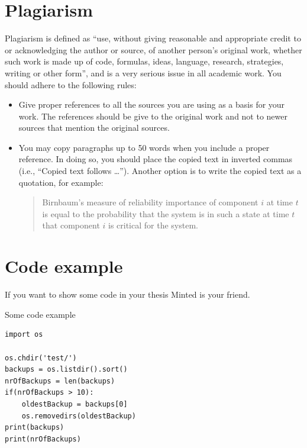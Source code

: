 \documentclass[../Main/thesis.tex]{subfiles}
\begin{document}
\section{Plagiarism}
\label{sec:plagiarism}
Plagiarism is defined as ``use, without giving reasonable and appropriate credit to or acknowledging the author or source, of another person's original work, whether such work is made up of code, formulas, ideas, language, research, strategies, writing or other form'', and is a very serious issue in all academic work. You should adhere to the following rules:
\begin{itemize}
\item Give proper references to all the sources you are using as a basis for your work. The references should be give to the original work and not to newer sources that mention the original sources.
\item You may copy paragraphs up to 50 words when you include a proper reference. In doing so, you should place the copied text in inverted commas (i.e., ``Copied text follows \ldots''). Another option is to write the copied text as a quotation, for example:
\begin{quote}
Birnbaum's measure of reliability importance of component $i$ at time $t$ is equal to the probability that the system is in such a state at time $t$ that component $i$ is critical for the system.\newline \mbox{} \hfill \citet{rausand04}
\end{quote}
\end{itemize}

\section{Code example}
\label{sec:code_example}
If you want to show some code in your thesis Minted is your friend.
\begin{listing}[ht]
\caption{Some code example}
\label{lst:clean.py}
\begin{verbatim}
import os

os.chdir('test/')
backups = os.listdir().sort()
nrOfBackups = len(backups)
if(nrOfBackups > 10):
    oldestBackup = backups[0]
    os.removedirs(oldestBackup)
print(backups)
print(nrOfBackups)
\end{verbatim}
\end{listing}

\blankpage
\end{document}

